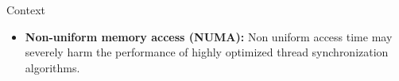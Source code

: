 \documentclass[final]{beamer}
\newlength{\onecolwid}
\begin{document}
\begin{frame}[t]
\begin{columns}[t]
\begin{column}{\onecolwid}
\begin{block}{Context}
\begin{itemize}
\item \textbf{Non-uniform memory access (NUMA):} Non uniform access time may severely harm the performance of highly optimized thread synchronization algorithms.
\end{itemize}












\end{block}
\end{column}
\end{columns}
\end{frame}
\end{document}

